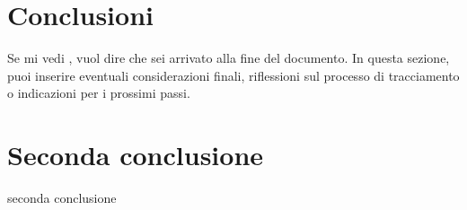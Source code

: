 \section{Conclusioni}
Se mi vedi , vuol dire che sei arrivato alla fine del documento. In questa sezione, puoi inserire eventuali considerazioni finali, riflessioni sul processo di tracciamento o indicazioni per i prossimi passi.
\section{Seconda conclusione}
seconda conclusione